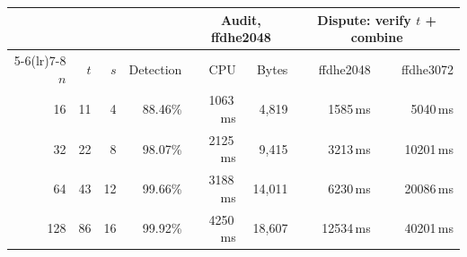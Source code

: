 \begin{tabular}{@{}rrrrrrrr@{}}
\toprule
 & & & & \multicolumn{2}{c}{Audit, ffdhe2048} & \multicolumn{2}{c}{Dispute: verify $t$ + combine}\\
\cmidrule(lr){5-6}\cmidrule(lr){7-8}
$n$ & $t$ & $s$ & Detection & CPU & Bytes & ffdhe2048 & ffdhe3072\\
\midrule
16 & 11 & 4 & 88.46\% & 1063\,ms & 4,819 & 1585\,ms & 5040\,ms\\
32 & 22 & 8 & 98.07\% & 2125\,ms & 9,415 & 3213\,ms & 10201\,ms\\
64 & 43 & 12 & 99.66\% & 3188\,ms & 14,011 & 6230\,ms & 20086\,ms\\
128 & 86 & 16 & 99.92\% & 4250\,ms & 18,607 & 12534\,ms & 40201\,ms\\
\bottomrule
\end{tabular}

